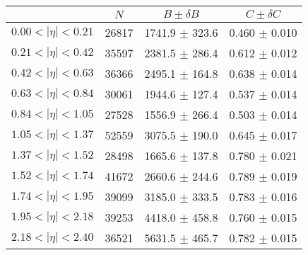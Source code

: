 \begin{tabular}{lccc}
\hline
    &   $N$   & $B \pm \delta B$  &  $C \pm \delta C$ \\
\hline
$0.00 < |\eta| <0.21$          & 26817      & 1741.9     $\pm$ 323.6 & 0.460      $\pm$ 0.010 \\
$0.21 < |\eta| <0.42$          & 35597      & 2381.5     $\pm$ 286.4 & 0.612      $\pm$ 0.012 \\
$0.42 < |\eta| <0.63$          & 36366      & 2495.1     $\pm$ 164.8 & 0.638      $\pm$ 0.014 \\
$0.63 < |\eta| <0.84$          & 30061      & 1944.6     $\pm$ 127.4 & 0.537      $\pm$ 0.014 \\
$0.84 < |\eta| <1.05$          & 27528      & 1556.9     $\pm$ 266.4 & 0.503      $\pm$ 0.014 \\
$1.05 < |\eta| <1.37$          & 52559      & 3075.5     $\pm$ 190.0 & 0.645      $\pm$ 0.017 \\
$1.37 < |\eta| <1.52$          & 28498      & 1665.6     $\pm$ 137.8 & 0.780      $\pm$ 0.021 \\
$1.52 < |\eta| <1.74$          & 41672      & 2660.6     $\pm$ 244.6 & 0.789      $\pm$ 0.019 \\
$1.74 < |\eta| <1.95$          & 39099      & 3185.0     $\pm$ 333.5 & 0.783      $\pm$ 0.016 \\
$1.95 < |\eta| <2.18$          & 39253      & 4418.0     $\pm$ 458.8 & 0.760      $\pm$ 0.015 \\
$2.18 < |\eta| <2.40$          & 36521      & 5631.5     $\pm$ 465.7 & 0.782      $\pm$ 0.015 \\
\hline
\end{tabular}
